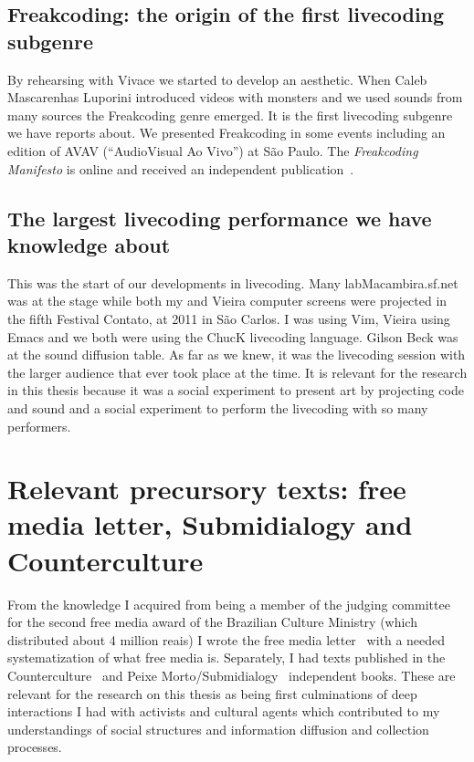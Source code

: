 \begin{apendicesenv}
\subsection{Freakcoding: the origin of the first livecoding subgenre}
By rehearsing with Vivace we started to develop an aesthetic.
When Caleb Mascarenhas Luporini introduced videos with monsters and
we used sounds from many sources the Freakcoding genre emerged.
It is the first livecoding subgenre we have reports about.
We presented Freakcoding in some events including an edition
of AVAV (``AudioVisual Ao Vivo'') at São Paulo.
The \emph{Freakcoding Manifesto} is online and received
an independent publication~\cite{freakManifesto}.

\subsection{The largest livecoding performance we have knowledge about}
This was the start of our developments in livecoding.
Many labMacambira.sf.net was at the stage while both my and Vieira computer screens
were projected in the fifth Festival Contato, at 2011 in São Carlos.
I was using Vim, Vieira using Emacs and we both were using the ChucK
livecoding language.
Gilson Beck was at the sound diffusion table.
As far as we knew, it was the livecoding session with the larger audience
that ever took place at the time.
It is relevant for the research in this thesis because it was
a social experiment to present art by projecting code and sound
and a social experiment to perform the livecoding with so many performers.

\section{Relevant precursory texts: free media letter, Submidialogy and Counterculture}
From the knowledge I acquired from being a member of the judging committee for the second
free media award of the Brazilian Culture Ministry (which distributed about 4 million reais)
I wrote the free media letter~\cite{cartaML} with a needed systematization of what free media is.
Separately, I had texts published in the Counterculture~\cite{ccd} and Peixe Morto/Submidialogy~\cite{subMid} independent books.
These are relevant for the research on this thesis as being first culminations of deep interactions
I had with activists and cultural agents which contributed to my understandings of social structures
and information diffusion and collection processes.

\end{apendicesenv}
